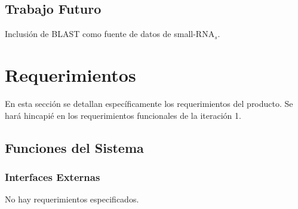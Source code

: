 \documentclass[12pt,a4paper,spanish]{article}
\begin{document}
\subsection{Trabajo Futuro}
	Inclusión de BLAST como fuente de datos de small-RNA$_s$.

\section{Requerimientos}
\label{section-req} 
En esta sección se detallan específicamente los requerimientos del producto. Se hará hincapié en los requerimientos funcionales de la iteración 1. 	

\subsection{Funciones del Sistema}

	\subsubsection{Interfaces Externas}
		No hay requerimientos especificados.
		
\end{document}
